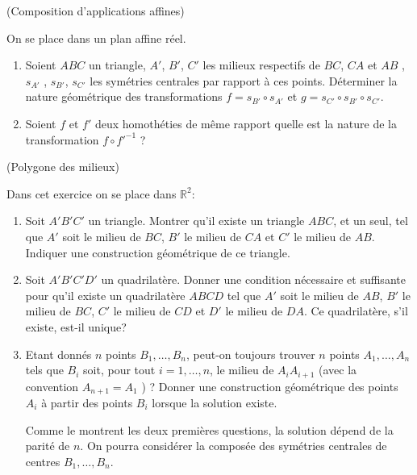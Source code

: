 \documentclass[a4paper,12pt,reqno]{amsart}
\begin{document}
\begin{exo} (Composition d'applications affines)

  On se place dans un plan affine réel.
  \begin{enumerate}
    \item Soient $ABC$ un triangle, $A'$, $B'$, $C'$ les milieux respectifs de $BC$, $CA$ et $AB$ , $s_{A'}$ , $s_{B'}$, $s_{C'}$ les symétries centrales par rapport à ces points. Déterminer la nature géométrique des transformations $f=s_{B'}\circ s_{A'}$ et $g=s_{C'}\circ s_{B'}\circ s_{C'}$.

    \item Soient $f$ et $f'$ deux homothéties de même rapport quelle est la nature de la transformation $f\circ f'^{-1}$ ?
  \end{enumerate}
\end{exo}

\begin{exo} (Polygone des milieux)

  Dans cet exercice on se place dans $\mathbb{R}^{2}$:

  \begin{enumerate}
    \item Soit $A'B'C'$ un triangle. Montrer qu'il existe un triangle $ABC$, et un seul, tel que $A'$ soit le milieu de $BC$, $B'$ le milieu de $CA$ et $C'$ le milieu de $AB$. Indiquer une construction géométrique de ce triangle.

    \item Soit $A'B'C'D'$ un quadrilatère. Donner une condition nécessaire et suffisante pour qu'il existe un quadrilatère $ABCD$ tel que $A'$ soit le milieu de $AB$, $B'$ le milieu de $BC$, $C'$ le milieu de $CD$ et $D'$ le milieu de $DA$. Ce quadrilatère, s'il existe, est-il unique?

    \item\hard Etant donnés $n$ points $B_{1},\ldots,B_{n}$, peut-on toujours trouver $n$ points $A_{1},\ldots,A_{n}$ tels que $B_{i}$ soit, pour tout $i=1,\ldots,n$, le milieu de $A_{i}A_{i+1}$ (avec la convention $A_{n+1}=A_{1}$ ) ? Donner une construction géométrique des points $A_{i}$ à partir des points $B_{i}$ lorsque la solution existe.\newline
    \begin{indication}
      Comme le montrent les deux premières questions, la solution dépend de la parité de $n$. On pourra considérer la composée des symétries centrales de centres $B_{1},\ldots,B_{n}$.
    \end{indication}

  \end{enumerate}
\end{exo}
\end{document}
